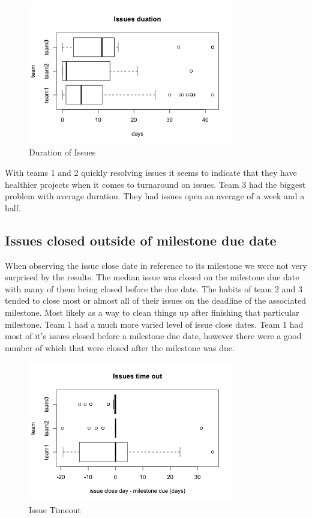 \documentclass[conference]{IEEEtran}
\begin{document}
\begin{figure}[H]
    \centering
    \includegraphics[width=9cm]{../AprilProject/pic/issues_duration.png}
    \caption{Duration of Issues}
    \label{issue_duration}
\end{figure}

With teams 1 and 2 quickly resolving issues it seems to indicate that they have healthier projects when it comes to turnaround on issues. Team 3 had the biggest problem with average duration. They had issues open an average of a week and a half. 

\subsection{Issues closed outside of milestone due date}
When observing the issue close date in reference to its milestone we were not very surprised by the results. The median issue was closed on the milestone due date with many of them being closed before the due date. The habits of team 2 and 3 tended to close most or almost all of their issues on the deadline of the associated milestone. Most likely as a way to clean things up after finishing that particular milestone. Team 1 had a much more varied level of issue close dates. Team 1 had most of it's issues closed before a milestone due date, however there were a good number of which that were closed after the milestone was due. 

\begin{figure}[H]
    \centering
    \includegraphics[width=9cm]{../AprilProject/pic/issues_timeout.png}
    \caption{Issue Timeout}
    \label{issue_timeout}
\end{figure}
\end{document}
